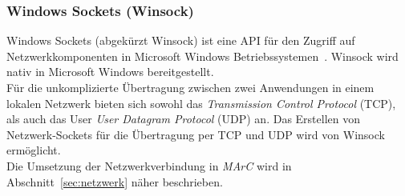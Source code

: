 \subsubsection{Windows Sockets (Winsock)}\label{sec:Winsock}
Windows Sockets (abgekürzt Winsock) ist eine API für den Zugriff auf Netzwerkkomponenten in Microsoft Windows Betriebssystemen~\cite{quinn1998windows}. Winsock wird nativ in Microsoft Windows bereitgestellt.\\ 
Für die unkomplizierte Übertragung zwischen zwei Anwendungen in einem lokalen Netzwerk bieten sich sowohl das \emph{Transmission Control Protocol} (TCP), als auch das User \emph{User Datagram Protocol} (UDP) an. Das Erstellen von Netzwerk-Sockets für die Übertragung per TCP und UDP wird von Winsock ermöglicht.\\ Die Umsetzung der Netzwerkverbindung in \emph{MArC} wird in Abschnitt~\ref{sec:netzwerk} näher beschrieben.
\newpage